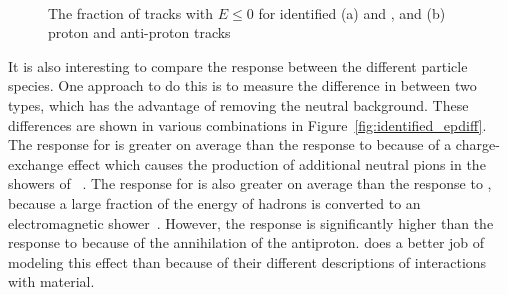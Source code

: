 \begin{figure}[h]
\centering
{}
~
\caption{ The fraction of tracks with $E \leq 0$ for identified (a) \pip and \pim, and (b) proton and anti-proton tracks}
\label{fig:identified_zero_fraction}
\end{figure}

It is also interesting to compare the response between the different particle species.
One approach to do this is to measure the difference in \epav between two types, which has the advantage of removing the neutral background.
These differences are shown in various combinations in Figure~\ref{fig:identified_epdiff}. 
The response for \pip is greater on average than the response to \pim because of a charge-exchange effect which causes the production of additional neutral pions in the showers of \pip~\cite{particlebeam}. 
The response for \pip is also greater on average than the response to \pP, because a large fraction of the energy of \pip hadrons is converted to an electromagnetic shower~\cite{physicsg,TileTB}. 
However, the \pAP response is significantly higher than the response to \pim because of the annihilation of the antiproton.
\FTFP does a better job of modeling this effect than \QGSP because of their different descriptions of \pAP interactions with material.

